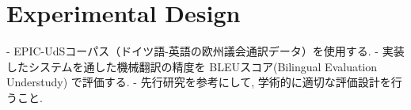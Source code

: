 \section{Experimental Design}

- EPIC-UdSコーパス（ドイツ語-英語の欧州議会通訳データ）を使用する. 
- 実装したシステムを通した機械翻訳の精度を  BLEUスコア(Bilingual Evaluation Understudy) で評価する. 
- 先行研究を参考にして, 学術的に適切な評価設計を行うこと.
